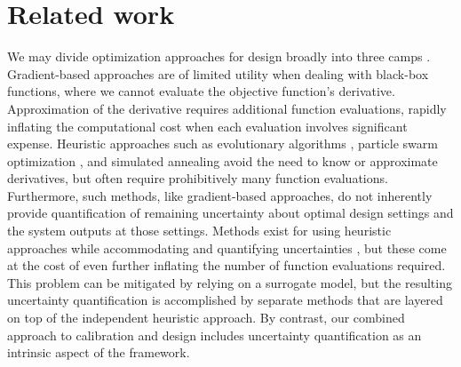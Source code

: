 \documentclass[10pt]{asme2ej}
\begin{document}
\section{Related work}\label{sec:related_work}
%
We may divide optimization approaches for design broadly into three camps \cite{Regis2004}.
%
Gradient-based approaches \cite{Nocedal2006} are of limited utility when dealing with black-box functions, where we cannot evaluate the objective function's derivative.
%
Approximation of the derivative requires additional function evaluations, rapidly inflating the computational cost when each evaluation involves significant expense.
%
Heuristic approaches \cite{Lee2007} such as evolutionary algorithms \cite{Branke2008,Deb2002,Kim2004}, particle swarm optimization \cite{Bonyadi2017,Mason2017}, and simulated annealing \cite{Robert2004} avoid the need to know or approximate derivatives, but often require prohibitively many function evaluations.
%
Furthermore, such methods, like gradient-based approaches, do not inherently provide quantification of remaining uncertainty about optimal design settings and the system outputs at those settings.
%
Methods exist for using heuristic approaches while accommodating and quantifying uncertainties \cite{Deb2006,Zhou2011b}, but these come at the cost of even further inflating the number of function evaluations required.
%
This problem can be mitigated by relying on a surrogate model, but the resulting uncertainty quantification is accomplished by separate methods that are layered on top of the independent heuristic approach.
%
By contrast, our combined approach to calibration and design includes uncertainty quantification as an intrinsic aspect of the framework.
%
\end{document}
